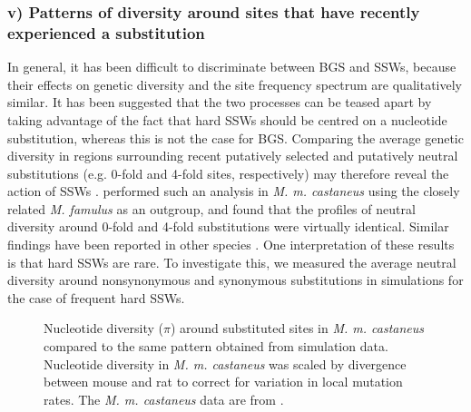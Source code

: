\linespread{1}

\linespread{2}


\subsubsection{v) Patterns of diversity around sites that have recently experienced a substitution}

	In general, it has been difficult to discriminate between BGS and SSWs, because their effects on genetic diversity and the site frequency spectrum are qualitatively similar. It has been suggested that the two processes can be teased apart by taking advantage of the fact that hard SSWs should be centred on a nucleotide substitution, whereas this is not the case for BGS. Comparing the average genetic diversity in regions surrounding recent putatively selected and putatively neutral substitutions (e.g. 0-fold and 4-fold sites, respectively) may therefore reveal the action of SSWs \citep{RN162, RN167}. \cite{RN122} performed such an analysis in \textit{M. m. castaneus} using the closely related \textit{M. famulus} as an outgroup, and found that the profiles of neutral diversity around 0-fold and 4-fold substitutions were virtually identical. Similar findings have been reported in other species \citep{RN162,RN230}. One interpretation of these results is that hard SSWs are rare. To investigate this, we measured the average neutral diversity around nonsynonymous and synonymous substitutions in simulations for the case of frequent hard SSWs.


 \begin{figure}[H]
   \centering      
   \noindent{}
 \caption[Reductions in nucleotide diversity around recent substitutions in \textit{M. m. castaneus} and simulated populations]{Nucleotide diversity ($\pi$) around substituted sites in \textit{M. m. castaneus} compared to the same pattern obtained from simulation data. Nucleotide diversity in \textit{M. m. castaneus} was scaled by divergence between mouse and rat to correct for variation in local mutation rates. The \textit{M. m. castaneus} data are from \cite{RN122}. }
 \label{fig:SattathPlot}
\end{figure}



